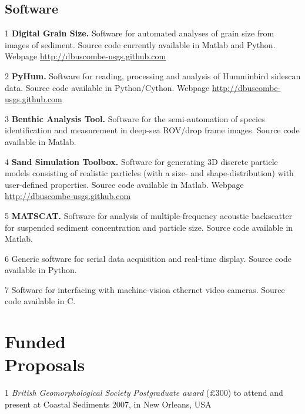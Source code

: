 \documentclass[margin,line]{resume}
\begin{document}
\begin{resume}
	\subsection{\mysidestyle Software}

        \begin{footnotesize}
	\begin{list1}
	 
	\item[1] {\bf Digital Grain Size.} Software for automated analyses of grain size from images of sediment. Source code currently available in Matlab and Python. Webpage \url{http://dbuscombe-usgs.github.com}\\
	\item[2] {\bf PyHum.} Software for reading, processing and analysis of Humminbird sidescan data. Source code available in Python/Cython. Webpage \url{http://dbuscombe-usgs.github.com}\\
	\item[3] {\bf Benthic Analysis Tool.} Software for the semi-automation of species identification and measurement in deep-sea ROV/drop frame images. Source code available in Matlab.\\
        \item[4] {\bf Sand Simulation Toolbox.} Software for generating 3D discrete particle models consisting of realistic particles (with a size- and shape-distribution) with user-defined properties. Source code available in Matlab. Webpage \url{http://dbuscombe-usgs.github.com}\\
        \item[5] {\bf MATSCAT.} Software for analysis of multiple-frequency acoustic backscatter for suspended sediment concentration and particle size. Source code available in Matlab.\\
      \item[6] Generic software for serial data acquisition and real-time display. Source code available in Python.\\
        \item[7] Software for interfacing with machine-vision ethernet video cameras. Source code available in C.

	\end{list1}
        \end{footnotesize}

    \section{\mysidestyle Funded \\ Proposals}
        \begin{footnotesize}
	\begin{list1}
	\item[1] {\sl British Geomorphological Society Postgraduate award} ($\pounds$300) to attend and present at Coastal Sediments 2007, in New Orleans, USA\\
	

\end{list1}
\end{footnotesize}
\end{resume}
\end{document}
